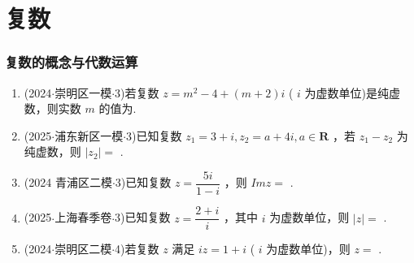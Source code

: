 \chapter*{复数}
\subsection*{复数的概念与代数运算}
\begin{enumerate}
    \item (2024$\cdot$崇明区一模$\cdot$3)若复数 $z = {m}^{2} - 4 + \left( {m + 2}\right) {i}$ ( ${i}$ 为虚数单位)是纯虚数，则实数 $m$ 的值为.
    \item (2025$\cdot$浦东新区一模$\cdot$3)已知复数 ${z}_{1} = 3 + {i},{z}_{2} = a + 4{i},a \in  \mathbf{R}$ ，若 ${z}_{1} - {z}_{2}$ 为纯虚数，则 $\left| {z}_{2}\right|  =$ .
    \item (2024 青浦区二模$\cdot$3)已知复数 $z = \dfrac{5{i}}{1 - {i}}$ ，则 ${Im}z =$ .
    \item (2025$\cdot$上海春季卷$\cdot$3)已知复数 $z = \dfrac{2 + {i}}{{i}}$ ，其中 ${i}$ 为虚数单位，则 $\left| z\right|  =$ .
    \item (2024$\cdot$崇明区二模$\cdot$4)若复数 $z$ 满足 ${i}z = 1 + {i}$ ( ${i}$ 为虚数单位)，则 $z =$ .
\end{enumerate}
